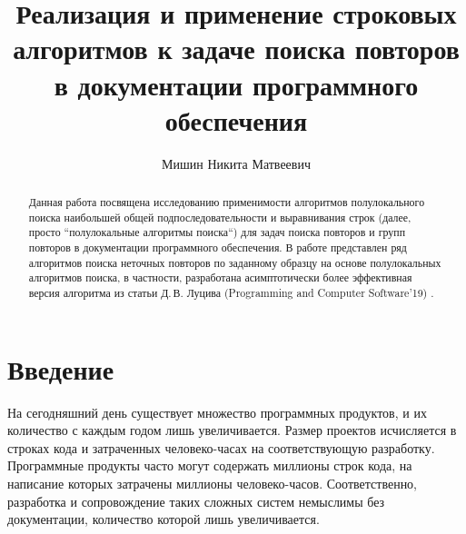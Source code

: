 \def\mcirc{\mathbin{\scalerel*{\circ}{j}}}
\def\msquare{\mathord{\scalerel*{\Box}{gX}}}


\title{Реализация и применение строковых алгоритмов к задаче поиска
повторов в документации программного обеспечения}


\author{Мишин Никита Матвеевич}



\maketitle

\newcommand{\todo}[1]{{\color{red}{#1}}}

\begin{abstract}
Данная работа посвящена исследованию применимости алгоритмов полулокального поиска наибольшей общей подпоследовательности и выравнивания строк (далее, просто ``полулокальные алгоритмы поиска``) для задач поиска повторов и групп повторов в документации программного обеспечения.
В работе представлен ряд алгоритмов поиска неточных повторов по заданному образцу на основе полулокальных алгоритмов поиска, в частности, разработана асимптотически более эффективная версия алгоритма из статьи Д.\,В. Луцива  (Programming and Computer Software’19) .
\end{abstract}

\section*{Введение}

На сегодняшний день существует множество программных продуктов, и их количество с каждым годом лишь увеличивается.
Размер проектов исчисляется в строках кода и затраченных человеко-часах на соответствующую разработку.
Программные продукты часто могут содержать миллионы строк кода, на написание которых затрачены миллионы человеко-часов.
Соответственно, разработка и сопровождение таких сложных систем немыслимы без документации, количество которой лишь увеличивается.

